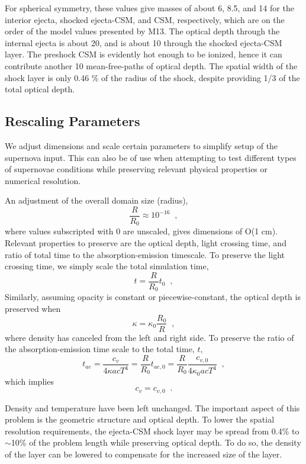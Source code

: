 For spherical symmetry, these values give masses of about 6, 8.5, and 14 for the interior ejecta, shocked ejecta-CSM, and CSM, respectively, which are on the order of the model values presented by M13. The optical depth through the internal ejecta is about 20, and is about 10 through the shocked ejecta-CSM layer. The preshock CSM is evidently hot enough to be ionized, hence it can contribute another 10 mean-free-paths of optical depth. The spatial width of the shock layer is only 0.46 \% of the radius of the shock, despite providing 1/3 of the total optical depth.

\subsection{Rescaling Parameters} \label{sec:rescaling}
We adjust dimensions and scale certain parameters to simplify setup of the supernova input. This can also be of use when attempting to test different types of supernovae conditions while preserving relevant physical properties or numerical resolution.

An adjustment of the overall domain size (radius),
\begin{equation}
\frac{R}{R_0} \approx 10^{-16} \;\;,
\end{equation}
where values subscripted with $0$ are unscaled, gives dimensions of O(1 cm). Relevant properties to preserve are the optical depth, light crossing time, and ratio of total time to the absorption-emission timescale. To preserve the light crossing time, we simply scale the total simulation time,
\begin{equation}
t = \frac{R}{R_0}t_0 \;\;,
\end{equation}
Similarly, assuming opacity is constant or piecewise-constant, the optical depth is preserved when
\begin{equation}
\kappa = \kappa_0\frac{R_0}{R} \;\;,
\end{equation}
where density has canceled from the left and right side. To preserve the ratio of the absorption-emission time scale to the total time, $t$,
\begin{equation}
t_{ae} = \frac{c_v}{4\kappa acT^4} = \frac{R}{R_0}t_{ae,0}
= \frac{R}{R_0}\frac{c_{v,0}}{4\kappa_0 acT^4} \;\;,
\end{equation}
which implies
\begin{equation}
c_v = c_{v,0} \;\;.
\end{equation}

Density and temperature have been left unchanged. The important aspect of this problem is the geometric structure and optical depth. To lower the spatial resolution requirements, the ejecta-CSM shock layer may be spread from 0.4\% to $\sim$10\% of the problem length while preserving optical depth. To do so, the density of the layer can be lowered to compensate for the increased size of the layer.

